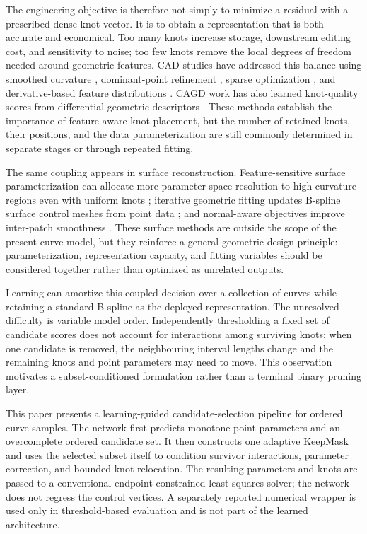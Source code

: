 \documentclass[preprint,12pt]{elsarticle}
\begin{document}
The engineering objective is therefore not simply to minimize a residual with
a prescribed dense knot vector. It is to obtain a representation that is both
accurate and economical. Too many knots increase storage, downstream editing
cost, and sensitivity to noise; too few knots remove the local degrees of
freedom needed around geometric features. CAD studies have addressed this
balance using smoothed curvature \cite{li2005}, dominant-point refinement
\cite{park2007}, sparse optimization \cite{kang2015}, and derivative-based
feature distributions \cite{yeh2020}. CAGD work has also learned knot-quality
scores from differential-geometric descriptors \cite{laube2018svm}. These
methods establish the importance of feature-aware knot placement, but the
number of retained knots, their positions, and the data parameterization are
still commonly determined in separate stages or through repeated fitting.

The same coupling appears in surface reconstruction. Feature-sensitive
surface parameterization can allocate more parameter-space resolution to
high-curvature regions even with uniform knots \cite{lai2006}; iterative
geometric fitting updates B-spline surface control meshes from point data
\cite{kineri2012}; and normal-aware objectives improve inter-patch smoothness
\cite{seiler2018}. These surface methods are outside the scope of the present
curve model, but they reinforce a general geometric-design principle:
parameterization, representation capacity, and fitting variables should be
considered together rather than optimized as unrelated outputs.

Learning can amortize this coupled decision over a collection of curves while
retaining a standard B-spline as the deployed representation. The unresolved
difficulty is variable model order. Independently thresholding a fixed set of
candidate scores does not account for interactions among surviving knots: when
one candidate is removed, the neighbouring interval lengths change and the
remaining knots and point parameters may need to move. This observation
motivates a subset-conditioned formulation rather than a terminal binary
pruning layer.

This paper presents a learning-guided candidate-selection pipeline for ordered
curve samples. The network first predicts monotone point parameters and an
overcomplete ordered candidate set. It then constructs one adaptive KeepMask
and uses the selected subset itself to condition survivor interactions,
parameter correction, and bounded knot relocation. The resulting parameters
and knots are passed to a conventional endpoint-constrained least-squares
solver; the network does not regress the control vertices. A separately
reported numerical wrapper is used only in threshold-based evaluation and is
not part of the learned architecture.
\end{document}
